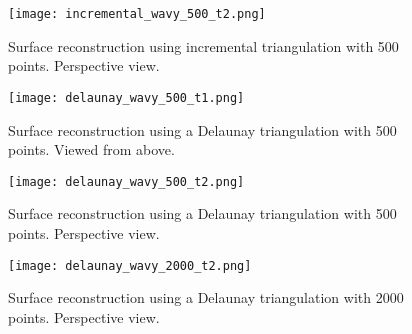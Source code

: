 \documentclass[a4paper, 10pt, conference]{ieeeconf}      %
\begin{document}
\begin{figure}[h]
	\begin{center}
   		\texttt{[image: incremental\_wavy\_500\_t2.png]}
    	\caption{Surface reconstruction using incremental triangulation with 500 points. Perspective view.}
    \end{center}
\end{figure}

\begin{figure}[h]
	\begin{center}
   		\texttt{[image: delaunay\_wavy\_500\_t1.png]}
    	\caption{Surface reconstruction using a Delaunay triangulation with 500 points. Viewed from above.}
    \end{center}
\end{figure}

\begin{figure}[h]
	\begin{center}
   		\texttt{[image: delaunay\_wavy\_500\_t2.png]}
    	\caption{Surface reconstruction using a Delaunay triangulation with 500 points. Perspective view.}
    \end{center}
\end{figure}

\begin{figure}[h]
	\begin{center}
   		\texttt{[image: delaunay\_wavy\_2000\_t2.png]}
    	\caption{Surface reconstruction using a Delaunay triangulation with 2000 points. Perspective view.}
    \end{center}
\end{figure}
\end{document}
